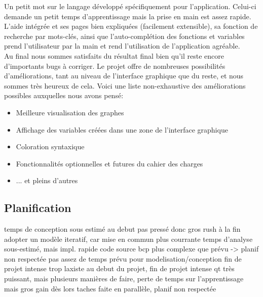 \documentclass[french]{article}
\begin{document}
			Un petit mot sur le langage développé spécifiquement pour l'application. Celui-ci demande un petit temps d'apprentissage mais la prise en main est assez rapide. L'aide intégrée et ses pages bien expliquées (facilement extensible), sa fonction de recherche par mots-clés, ainsi que l'auto-complétion des fonctions et variables prend l'utilisateur par la main et rend l'utilisation de l'application agréable.\\  
			
			Au final nous sommes satisfaits du résultat final bien qu'il reste encore d'importants bugs à corriger. Le projet offre de nombreuses possibilités d'améliorations, tant au niveau de l'interface graphique que du reste, et nous sommes très heureux de cela. Voici une liste non-exhaustive des améliorations possibles auxquelles nous avons pensé:
			\begin{itemize}
				\item Meilleure visualisation des graphes
				\item Affichage des variables créées dans une zone de l'interface graphique
				\item Coloration syntaxique
				\item Fonctionnalités optionnelles et futures du cahier des charges
				\item ... et pleins d'autres
			\end{itemize}
		
		\subsection{Planification}
			
			temps de conception sous estimé
			au debut pas pressé donc gros rush à la fin
			adopter un modèle iteratif, car mise en commun plus courrante
			temps d'analyse sous-estimé, mais impl. rapide
			code source bcp plus complexe que prévu -> planif non respectée
			pas assez de temps prévu pour modelisation/conception
			fin de projet intense
			trop laxiste au debut du projet, fin de projet intense
			qt très puissant, mais plusieurs manières de faire, perte de temps sur l'apprentissage mais gros gain dès lors
			taches faite en parallèle, planif non respectée
			
\end{document}

